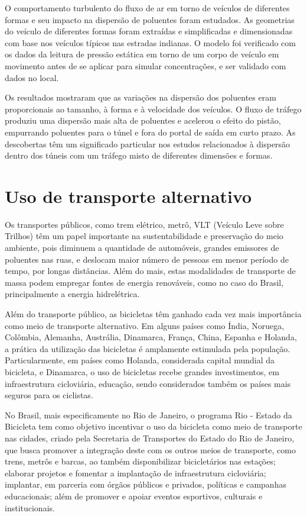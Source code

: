 O comportamento turbulento do fluxo de ar em torno de veículos de diferentes formas e seu impacto na 
dispersão de poluentes foram estudados. As geometrias do veículo de diferentes formas foram extraídas 
e simplificadas e dimensionadas com base nos veículos típicos nas estradas indianas. O modelo foi 
verificado com os dados da leitura de pressão estática em torno de um corpo de veículo em movimento 
antes de se aplicar para simular concentrações, e ser validado com dados no local.

Os resultados mostraram que as variações na dispersão dos poluentes eram proporcionais ao tamanho, à 
forma e à velocidade dos veículos. O fluxo de tráfego produziu uma dispersão mais alta de poluentes 
e acelerou o efeito do pistão, empurrando poluentes para o túnel e fora do portal de saída em curto 
prazo. As descobertas têm um significado particular nos estudos relacionados à dispersão dentro dos 
túneis com um tráfego misto de diferentes dimensões e formas.

\section{Uso de transporte alternativo}

Os transportes públicos, como trem elétrico, metrô, VLT (Veículo Leve sobre Trilhos) têm um papel 
importante na sustentabilidade e preservação do meio ambiente, pois diminuem a quantidade de 
automóveis, grandes emissores de poluentes nas ruas, e deslocam maior número de pessoas em menor 
período de tempo, por longas distâncias. Além do mais, estas modalidades de transporte de massa podem 
empregar fontes de energia renováveis, como no caso do Brasil, principalmente a energia hidrelétrica. 

Além do transporte público, as bicicletas têm ganhado cada vez mais importância  como meio de 
transporte alternativo. Em alguns países como Índia, Noruega, Colômbia, Alemanha, Austrália, 
Dinamarca, França, China, Espanha e Holanda, a prática da utilização das bicicletas é amplamente 
estimulada pela população. Particularmente, em países como Holanda, considerada capital mundial da 
bicicleta, e Dinamarca, o uso de bicicletas recebe grandes investimentos, em infraestrutura 
cicloviária, educação, sendo considerados também os países mais seguros para os ciclistas.

No Brasil, mais especificamente no Rio de Janeiro, o programa Rio - Estado da Bicicleta tem como 
objetivo incentivar o uso da bicicleta como meio de transporte nas cidades, criado pela Secretaria de 
Transportes do Estado do Rio de Janeiro, que busca promover a integração deste com os outros meios de 
transporte, como trens, metrôs e barcas, ao também disponibilizar bicicletários nas estações; 
elaborar projetos e fomentar a implantação de infraestrutura cicloviária; implantar, em parceria com 
órgãos públicos e privados, políticas e campanhas educacionais; além de promover e apoiar eventos 
esportivos, culturais e institucionais.

